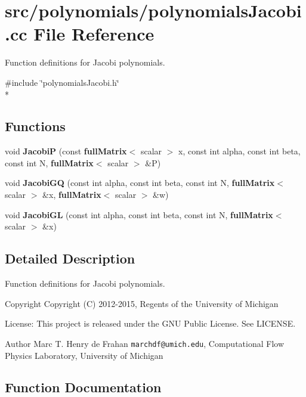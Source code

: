 \section{src/polynomials/polynomials\-Jacobi.cc File Reference}
\label{polynomialsJacobi_8cc}


Function definitions for Jacobi polynomials.  


{\ttfamily \#include \char`\"{}polynomials\-Jacobi.\-h\char`\"{}}\\*
\subsection*{Functions}
\begin{DoxyCompactItemize}
\item 
void {\bf Jacobi\-P} (const {\bf full\-Matrix}$<$ scalar $>$ x, const int alpha, const int beta, const int N, {\bf full\-Matrix}$<$ scalar $>$ \&P)
\item 
void {\bf Jacobi\-G\-Q} (const int alpha, const int beta, const int N, {\bf full\-Matrix}$<$ scalar $>$ \&x, {\bf full\-Matrix}$<$ scalar $>$ \&w)
\item 
void {\bf Jacobi\-G\-L} (const int alpha, const int beta, const int N, {\bf full\-Matrix}$<$ scalar $>$ \&x)
\end{DoxyCompactItemize}


\subsection{Detailed Description}
Function definitions for Jacobi polynomials. \begin{DoxyCopyright}{Copyright}
Copyright (C) 2012-\/2015, Regents of the University of Michigan 
\end{DoxyCopyright}
\begin{DoxyParagraph}{License\-:}
This project is released under the G\-N\-U Public License. See L\-I\-C\-E\-N\-S\-E. 
\end{DoxyParagraph}
\begin{DoxyAuthor}{Author}
Marc T. Henry de Frahan {\tt marchdf@umich.\-edu}, Computational Flow Physics Laboratory, University of Michigan 
\end{DoxyAuthor}


\subsection{Function Documentation}
